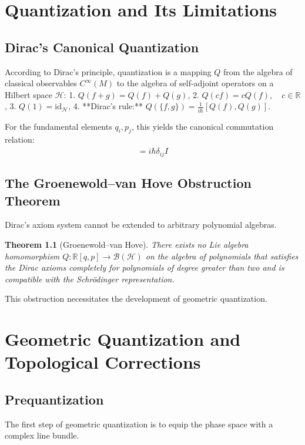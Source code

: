 \documentclass[11pt,a4paper,oneside]{book}
\theoremstyle{definition}
\theoremstyle{plain}
\newtheorem{theorem}[definition]{Theorem}
\newcommand{\R}{\mathbb{R}}
\newcommand{\id}{\text{id}}
\begin{document}
\chapter{Quantization and Its Limitations}

\section{Dirac's Canonical Quantization}
According to Dirac's principle, quantization is a mapping $Q$ from the algebra of classical observables $C^\infty(M)$ to the algebra of self-adjoint operators on a Hilbert space $\mathcal{H}$:
1. $Q(f + g) = Q(f) + Q(g)$,
2. $Q(c f) = c Q(f), \quad c \in \R$,
3. $Q(1) = \id_{\mathcal{H}}$,
4. **Dirac's rule:** $Q(\{f, g\}) = \frac{1}{i\hbar} [Q(f), Q(g)]$.

For the fundamental elements $q_i, p_j$, this yields the canonical commutation relation:
\begin{equation}
[\hat{q}_i, \hat{p}_j] = i\hbar \delta_{ij} \hat{I}
\end{equation}

\section{The Groenewold--van Hove Obstruction Theorem}
Dirac's axiom system cannot be extended to arbitrary polynomial algebras.

\begin{theorem}[Groenewold--van Hove]
There exists no Lie algebra homomorphism $Q: \mathbb{R}[q, p] \to \mathcal{B}(\mathcal{H})$ on the algebra of polynomials that satisfies the Dirac axioms completely for polynomials of degree greater than two and is compatible with the Schrödinger representation.
\end{theorem}

This obstruction necessitates the development of geometric quantization.


\chapter{Geometric Quantization and Topological Corrections}

\section{Prequantization}
The first step of geometric quantization is to equip the phase space with a complex line bundle.
\end{document}
